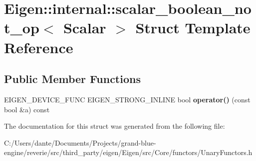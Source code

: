 \hypertarget{struct_eigen_1_1internal_1_1scalar__boolean__not__op}{}\section{Eigen\+::internal\+::scalar\+\_\+boolean\+\_\+not\+\_\+op$<$ Scalar $>$ Struct Template Reference}
\label{struct_eigen_1_1internal_1_1scalar__boolean__not__op}
\subsection*{Public Member Functions}
\begin{DoxyCompactItemize}
\item 
\mbox{\label{struct_eigen_1_1internal_1_1scalar__boolean__not__op_a781b0e19b1eeae19ae662440110e7e67}} 
E\+I\+G\+E\+N\+\_\+\+D\+E\+V\+I\+C\+E\+\_\+\+F\+U\+NC E\+I\+G\+E\+N\+\_\+\+S\+T\+R\+O\+N\+G\+\_\+\+I\+N\+L\+I\+NE bool {\bfseries operator()} (const bool \&a) const
\end{DoxyCompactItemize}


The documentation for this struct was generated from the following file\+:\begin{DoxyCompactItemize}
\item 
C\+:/\+Users/dante/\+Documents/\+Projects/grand-\/blue-\/engine/reverie/src/third\+\_\+party/eigen/\+Eigen/src/\+Core/functors/Unary\+Functors.\+h\end{DoxyCompactItemize}
